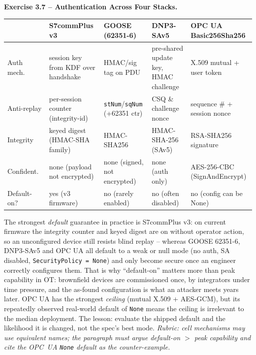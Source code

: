 \documentclass[11pt,a4paper]{article}
\begin{document}
\begin{solutionbox}
\textbf{Exercise 3.7 -- Authentication Across Four Stacks.}
\begin{center}\small
\setlength{\tabcolsep}{4pt}
\par\begin{tabular}{p{2.3cm}p{2.6cm}p{2.6cm}p{2.6cm}p{2.7cm}}
\toprule
 & \textbf{S7commPlus v3} & \textbf{GOOSE (62351-6)} & \textbf{DNP3-SAv5} & \textbf{OPC UA Basic256Sha256} \\
\midrule
Auth mech.\ & session key from KDF over handshake & HMAC/sig tag on PDU & pre-shared update key, HMAC challenge & X.509 mutual + user token \\
Anti-replay & per-session counter (integrity-id) & \texttt{stNum}/\texttt{sqNum} (+62351 ctr) & CSQ \& challenge nonce & sequence \# + session nonce \\
Integrity & keyed digest (HMAC-SHA family) & HMAC-SHA256 & HMAC-SHA-256 (SAv5) & RSA-SHA256 signature \\
Confident.\ & none (payload not encrypted) & none (signed, not encrypted) & none (auth only) & AES-256-CBC (SignAndEncrypt) \\
Default-on? & yes (v3 firmware) & no (rarely enabled) & no (often disabled) & no (config can be None) \\
\bottomrule
\end{tabular}
\end{center}
\noindent The strongest \emph{default} guarantee in practice is S7commPlus
v3: on current firmware the integrity counter and keyed digest are on
without operator action, so an unconfigured device still resists blind
replay -- whereas GOOSE 62351-6, DNP3-SAv5 and OPC UA all default to a weak
or null mode (no auth, SA disabled, \texttt{SecurityPolicy = None}) and only
become secure once an engineer correctly configures them. That is why
``default-on'' matters more than peak capability in OT: brownfield devices
are commissioned once, by integrators under time pressure, and the
as-found configuration is what an attacker meets years later. OPC UA has the
strongest \emph{ceiling} (mutual X.509 + AES-GCM), but its repeatedly
observed real-world default of \texttt{None} means the ceiling is irrelevant
to the median deployment. The lesson: evaluate the shipped default and the
likelihood it is changed, not the spec's best mode.
\textit{Rubric: cell mechanisms may use equivalent names; the paragraph must
argue default-on $>$ peak capability and cite the OPC~UA \texttt{None}
default as the counter-example.}
\end{solutionbox}
\end{document}
